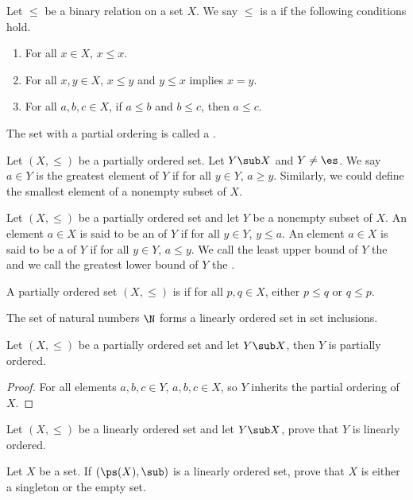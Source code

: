 \documentclass[10pt]{article}
\begin{document}
\begin{definition}
    Let $\le$ be a binary relation on a set $X$. We say $\le$ is a  if the following conditions hold.
    \begin{enumerate}
        \item For all $x\in X$, $x\le x$.
        \item For all $x,y\in X$, $x\le y$ and $y\le x$ implies $x=y$.
        \item For all $a,b,c\in X$, if $a\le b$ and $b\le c$, then $a\le c$.
    \end{enumerate}
    The set with a partial ordering is called a .
\end{definition}
\par
Let $(X,\le)$ be a partially ordered set. Let $Y\sub X$ and $Y\ne\es$. We say $a\in Y$ is the greatest element of $Y$ if for all $y\in Y$, $a\ge y$. Similarly, we could define the smallest element of a nonempty subset of $X$.
\begin{definition}
    Let $(X,\le)$ be a partially ordered set and let $Y$ be a nonempty subset of $X$. An element $a\in X$ is said to be an  of $Y$ if for all $y\in Y$, $y\le a$. An element $a\in X$ is said to be a  of $Y$ if for all $y\in Y$, $a\le y$. We call the least upper bound of $Y$ the  and we call the greatest lower bound of $Y$ the .
\end{definition}
\begin{definition}
    A partially ordered set $(X,\le)$ is  if for all $p,q\in X$, either $p\le q$ or $q\le p$.
\end{definition}
\begin{example}
    The set of natural numbers $\N$ forms a linearly ordered set in set inclusions.
\end{example}
\begin{proposition}
    Let $(X,\le)$ be a partially ordered set and let $Y\sub X$, then $Y$ is partially ordered.
\end{proposition}
\begin{proof}
    For all elements $a,b,c\in Y$, $a,b,c\in X$, so $Y$ inherits the partial ordering of $X$.
\end{proof}
\begin{problem}
    Let $(X,\le)$ be a linearly ordered set and let $Y\sub X$, prove that $Y$ is linearly ordered.
\end{problem}
\begin{problem}
    Let $X$ be a set. If $(\ps(X),\sub)$ is a linearly ordered set, prove that $X$ is either a singleton or the empty set.
\end{problem}
\end{document}

